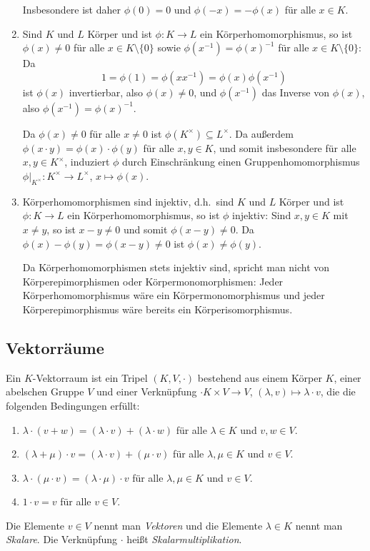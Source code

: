 \begin{bem}
\begin{enumerate}[leftmargin=*]
   Insbesondere ist daher $\phi(0) = 0$ und $\phi(-x) = -\phi(x)$ für alle $x \in K$.
  \item
   Sind $K$ und $L$ Körper und ist $\phi \colon K \to L$ ein Körperhomomorphismus, so ist $\phi(x) \neq 0$ für alle $x \in K \setminus \{0\}$ sowie $\phi(x^{-1}) = \phi(x)^{-1}$ für alle $x \in K \setminus \{0\}$: Da
   \[
    1 = \phi(1) = \phi(x x^{-1}) = \phi(x) \phi(x^{-1})
   \]
   ist $\phi(x)$ invertierbar, also $\phi(x) \neq 0$, und $\phi(x^{-1})$ das Inverse von $\phi(x)$, also $\phi(x^{-1}) = \phi(x)^{-1}$.
   
   Da $\phi(x) \neq 0$ für alle $x \neq 0$ ist $\phi(K^\times) \subseteq L^\times$. Da außerdem $\phi(x \cdot y) = \phi(x) \cdot \phi(y)$ für alle $x,y \in K$, und somit insbesondere für alle $x,y \in K^\times$, induziert $\phi$ durch Einschränkung einen Gruppenhomomorphismus $\phi|_{K^\times} \colon K^\times \to L^\times$, $x \mapsto \phi(x)$.
  \item
   Körperhomomorphismen sind injektiv, d.h.\ sind $K$ und $L$ Körper und ist $\phi \colon K \to L$ ein Körperhomomorphismus, so ist $\phi$ injektiv: Sind $x, y \in K$ mit $x \neq y$, so ist $x-y \neq 0$ und somit $\phi(x-y) \neq 0$. Da $\phi(x)-\phi(y) = \phi(x-y) \neq 0$ ist $\phi(x) \neq \phi(y)$.
   
   Da Körperhomomorphismen stets injektiv sind, spricht man nicht von Körperepimorphismen oder Körpermonomorphismen: Jeder Körperhomomorphismus wäre ein Körpermonomorphismus und jeder Körperepimorphismus wäre bereits ein Körperisomorphismus.
 \end{enumerate}
\end{bem}





\subsection{Vektorräume}


\begin{defi}
 Ein $K$-Vektorraum ist ein Tripel $(K,V,\cdot)$ bestehend aus einem Körper $K$, einer abelschen Gruppe $V$ und einer Verknüpfung $\cdot K \times V \to V$, $(\lambda, v) \mapsto \lambda \cdot v$, die die folgenden Bedingungen erfüllt:
 \begin{enumerate}[label=\roman*)]
  \item
   $\lambda \cdot (v+w) = (\lambda \cdot v) + (\lambda \cdot w)$ für alle $\lambda \in K$ und $v,w \in V$.
  \item
   $(\lambda + \mu) \cdot v = (\lambda \cdot v) + (\mu \cdot v)$ für alle $\lambda, \mu \in K$ und $v \in V$.
  \item
   $\lambda \cdot (\mu \cdot v) = (\lambda \cdot \mu) \cdot v$ für alle $\lambda, \mu \in K$ und $v \in V$.
  \item
   $1 \cdot v = v$ für alle $v \in V$.
 \end{enumerate}
 Die Elemente $v \in V$ nennt man \emph{Vektoren} und die Elemente $\lambda \in K$ nennt man \emph{Skalare}. Die Verknüpfung $\cdot$ heißt \emph{Skalarmultiplikation}.
\end{defi}


